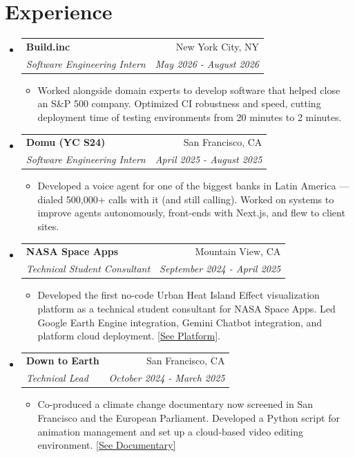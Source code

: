 \documentclass[10pt]{article}
\makeatletter
\newcommand{\resumeItem}[1]{
  \item\small{#1 \vspace{-2pt}}
}
\newcommand{\resumeSubheading}[4]{
  \vspace{-2pt}\item
    \begin{tabular*}{0.97\textwidth}[t]{l@{\extracolsep{\fill}}r}
      \textbf{#1} & #2 \\
      \textit{\small#3} & \textit{\small #4} \\
    \end{tabular*}\vspace{-5pt}
}
\newcommand{\resumeSubHeadingListStart}{\begin{itemize}[leftmargin=0.15in, label={}]}
\newcommand{\resumeSubHeadingListEnd}{\end{itemize}}
\newcommand{\resumeItemListStart}{\begin{itemize}}
\newcommand{\resumeItemListEnd}{\end{itemize}\vspace{-5pt}}
\makeatother
\begin{document}
\section{Experience}
  \resumeSubHeadingListStart
    \resumeSubheading
        {Build.inc}{New York City, NY}
        {Software Engineering Intern}{May 2026 - August 2026}
        \resumeItemListStart
            \resumeItem{Worked alongside domain experts to develop software that helped close an S\&P 500 company. Optimized CI robustness and speed, cutting deployment time of testing environments from 20 minutes to 2 minutes.}
        \resumeItemListEnd
    \resumeSubheading
        {Domu (YC S24)}{San Francisco, CA}
        {Software Engineering Intern}{April 2025 - August 2025}
        \resumeItemListStart
            \resumeItem{Developed a voice agent for one of the biggest banks in Latin America — dialed 500,000+ calls with it (and still calling). Worked on systems to improve agents autonomously, front-ends with Next.js, and flew to client sites.}
        \resumeItemListEnd
    \resumeSubheading
      {NASA Space Apps}{Mountain View, CA}
      {Technical Student Consultant}{September 2024 - April 2025}
      \resumeItemListStart
            \resumeItem{Developed the first no-code Urban Heat Island Effect visualization platform as a technical student consultant for NASA Space Apps. Led Google Earth Engine integration, Gemini Chatbot integration, and platform cloud deployment. \href{https://gravitas-new.streamlit.app}{[See Platform]}.}
      \resumeItemListEnd
    \resumeSubheading
      {Down to Earth}{San Francisco, CA}
      {Technical Lead}{October 2024 - March 2025}
      \resumeItemListStart
        \resumeItem{Co-produced a climate change documentary now screened in San Francisco and the European Parliament. Developed a Python script for animation management and set up a cloud-based video editing environment.
            \href{https://www.youtube.com/watch?v=MB_2-a7AHtc}{[See Documentary]}}
    \resumeItemListEnd
    \resumeSubHeadingListEnd

\end{document}
